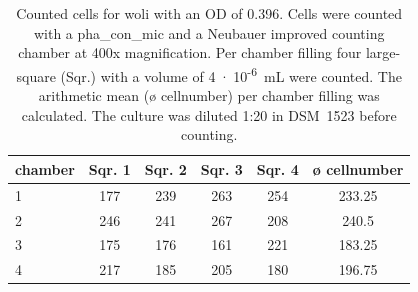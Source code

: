 \begin{table}[ht]
\centering
\caption[Counted cells for \acrlong{woli} with an \acrshort{OD} of 0.396.]{Counted cells for \acrlong{woli} with an \acrshort{OD} of 0.396. Cells were counted with a \gls{pha_con_mic} and a Neubauer improved counting chamber at 400x magnification. Per chamber filling four large-square (Sqr.) with a volume of 4~$\cdot$~10\textsuperscript{-6}~mL were counted. The arithmetic mean (ø cellnumber) per chamber filling was calculated. The culture was diluted 1:20 in DSM~1523 before counting.} 
\label{tab:cellnmr_wol_Neu_2}
\begin{tabular}{lccccc}
  \toprule
chamber & Sqr. 1 & Sqr. 2 & Sqr. 3 & Sqr. 4 & ø cellnumber \\ 
  \midrule
1 & 177 & 239 & 263 & 254 & 233.25 \\ 
  2 & 246 & 241 & 267 & 208 & 240.5 \\ 
  3 & 175 & 176 & 161 & 221 & 183.25 \\ 
  4 & 217 & 185 & 205 & 180 & 196.75 \\ 
   \bottomrule
\end{tabular}
\end{table}
